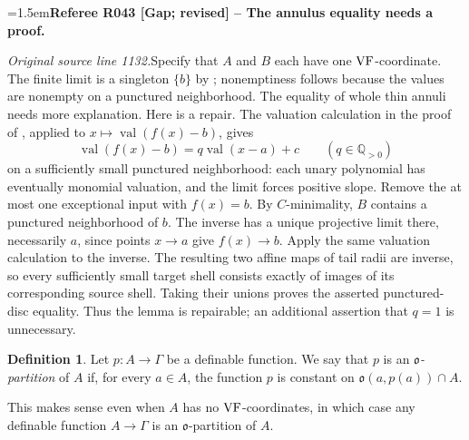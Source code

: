 \documentclass[12pt]{amsart}
\newcommand{\RefereeRemark}[4]{%
  \par\medskip\begingroup\normalfont\small\color{RefereePurple}%
  \emergencystretch=1.5em\noindent\textbf{Referee R#1 [#2] -- #3.}\par\nobreak\noindent #4\par
  \endgroup\medskip
}
\newcommand{\memph}[1]{{\color{magenta}\emph{#1}}}
\theoremstyle{plain}
\theoremstyle{definition}
\newtheorem{defn}[thm]{Definition}
\theoremstyle{remark}
\numberwithin{equation}{section}
\theoremstyle{plain}
\newcommand{\VF}{\textup{VF}}
\newcommand{\go}{\mathfrak{o}}
\newcommand{\0}{\emptyset}
\newcommand{\fun}{\longrightarrow}
\DeclareMathOperator{\vv}{val}
\begin{document}
\RefereeRemark{043}{Gap; revised}{The annulus equality needs a proof}{%
\textit{Original source line 1132.}\quad Specify that $A$ and $B$ each have one $\VF$-coordinate. The finite limit is a singleton $\{b\}$ by \cite[Lemma~9.4]{Yin:special:trans}; nonemptiness follows because the values are nonempty on a punctured neighborhood. The equality of whole thin annuli needs more explanation. Here is a repair. The valuation calculation in the proof of \cite[Lemma~8.3]{Yin:special:trans}, applied to $x\mapsto\vv(f(x)-b)$, gives
\[
 \vv(f(x)-b)=q\vv(x-a)+c\qquad(q\in\mathbb Q_{>0})
\]
on a sufficiently small punctured neighborhood: each unary polynomial has eventually monomial valuation, and the limit forces positive slope. Remove the at most one exceptional input with $f(x)=b$. By $C$-minimality, $B$ contains a punctured neighborhood of $b$. The inverse has a unique projective limit there, necessarily $a$, since points $x\to a$ give $f(x)\to b$. Apply the same valuation calculation to the inverse. The resulting two affine maps of tail radii are inverse, so every sufficiently small target shell consists exactly of images of its corresponding source shell. Taking their unions proves the asserted punctured-disc equality. Thus the lemma is repairable; an additional assertion that $q=1$ is unnecessary.
}

\begin{defn}
Let $p : A \fun \Gamma$ be a definable function. We say that $p$ is an \memph{$\go$-partition} of $A$ if, for every $a \in A$, the function $p$ is constant on $\go(a, p(a)) \cap A$.
\end{defn}


This makes sense even when $A$ has no $\VF$-coordinates, in which case any definable function $A \fun \Gamma$ is an $\go$-partition of $A$.
\end{document}

